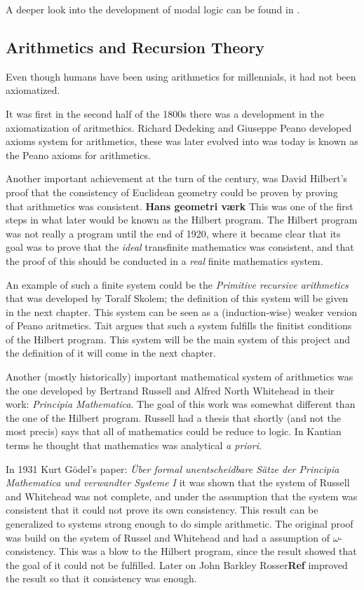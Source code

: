 \documentclass[../main.tex]{subfiles}
\begin{document}
A deeper look into the development of modal logic can be found in
\cite{Goldblatt2003}.
\subsection{Arithmetics and Recursion Theory}


Even though humans have been using arithmetics for millennials, it had not been
axiomatized.

It was first in  the second half of the 1800s there was a development in the axiomatization
of aritmethics. Richard Dedeking and Giuseppe Peano developed axioms system for arithmetics,
these was later evolved into was today is known as the Peano axioms for
arithmetics. 

Another important achievement at the turn of the century, was David Hilbert's
proof that the consistency of Euclidean geometry could be proven by proving
that arithmetics was consistent. \textbf{Hans geometri værk} This was one of the first steps in what later
would be known as the Hilbert program. 
The Hilbert program was not really a program until the end of 1920, where it
became clear that its goal was to prove that the \textit{ideal} transfinite mathematics was
consistent, and that the proof of this should be conducted in a \textit{real}
finite mathematics system.

An example of such a finite system could be the \textit{Primitive recursive
arithmetics} that was developed by Toralf Skolem; the definition of this system
will be given in the next chapter. This system can be seen as a
(induction-wise) weaker version of Peano aritmetics. Tait  argues
that such a system fulfills the finitist conditions of the Hilbert program.
This system will be the main system of this project and the definition of it
will come in the next chapter.

Another (mostly historically) important mathematical system of arithmetics was
the one developed by Bertrand Russell and Alfred North Whitehead in their work:
\textit{Principia Mathematica}. The goal of this work was somewhat different
than the one of the Hilbert program. Russell had a thesis that shortly (and not
the most precis) says that all of mathematics could be reduce to logic. In
Kantian terms he thought that mathematics was analytical \textit{a priori}. 

In 1931 Kurt Gödel's paper: \textit{Über formal unentscheidbare Sätze der
Principia Mathematica und verwandter Systeme I} it was shown  that the system of
Russell and Whitehead was not complete, and under the assumption that the
system was consistent that it could not prove its own consistency.
This result can be generalized to systems strong enough to do simple
arithmetic.
The
original proof was build on the system of Russel and Whitehead and had a
assumption of $\omega$-consistency. This
was a blow to the Hilbert program, since the result showed that the goal of it
could not be fulfilled. Later on John Barkley Rosser\textbf{Ref} improved the
result so that it  consistency was enough.
\end{document}

